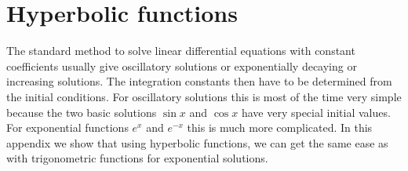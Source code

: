 %
%
%
\chapter{Hyperbolic functions
\label{chapter:hyperbolicfunctions}}
The standard method to solve linear differential equations with constant
coefficients usually give oscillatory solutions or exponentially
decaying or increasing solutions.
The integration constants then have to be determined from the initial
conditions.
For oscillatory solutions this is most of the time very simple because
the two basic solutions $\sin x$ and $\cos x$ have very special 
initial values.
For exponential functions $e^x$ and $e^{-x}$ this is much more
complicated.
In this appendix we show that using hyperbolic functions, we can
get the same ease as with trigonometric functions for exponential
solutions.



